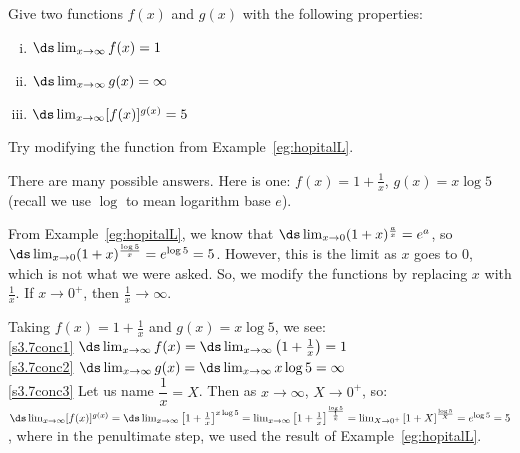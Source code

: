 \begin{Mquestion}\label{s3.7indet3}
Give two functions $f(x)$ and $g(x)$ with the following properties:
\begin{enumerate}[(i)]
\item\label{s3.7conc1} $\ds\lim_{x \to \infty} f(x)=1$
\item\label{s3.7conc2} $\ds\lim_{x \to \infty} g(x)=\infty$
\item\label{s3.7conc3} $\ds\lim_{x \to \infty} [f(x)]^{g(x)}=5$
\end{enumerate}
\end{Mquestion}
\begin{hint} Try modifying the function from Example~\ref*{eg:hopitalL}.%
\end{hint}
\begin{answer} There are many possible answers. Here is one: $f(x)=1+\frac{1}{x}$, $g(x)=x\log 5$ (recall we use $\log$ to mean logarithm base $e$).
\end{answer}
\begin{solution}
From Example~\ref*{eg:hopitalL}, we know that $\ds\lim_{x \to 0} (1+x)^{\frac{a}{x}}=e^a$, so $\ds\lim_{x \to 0} (1+x)^{\frac{\log 5}{x}}=e^{\log 5}=5$. However, this is the limit as $x$ goes to 0, which is not what we were asked. So, we modify the functions by replacing $x$ with $\frac{1}{x}$. If $x \to 0^+$, then $\frac{1}{x} \to \infty$.

Taking $f(x)=1+\frac{1}{x}$ and $g(x)=x\log 5$, we see:\\
\eqref{s3.7conc1} $\ds\lim_{x \to \infty} f(x)=\ds\lim_{x \to \infty } \left(1+\frac{1}{x}\right)=1$\\
\eqref{s3.7conc2} $\ds\lim_{x \to \infty} g(x)=\ds\lim_{x \to \infty} x\log 5=\infty$\\
\eqref{s3.7conc3} Let us name $\dfrac{1}{x}=X$. Then as $x \to \infty$, $X \to 0^+$, so:\\
 $\ds\lim_{x \to \infty} [f(x)]^{g(x)}=\ds\lim_{x \to \infty} \left[1+\frac{1}{x}\right]^{x\log 5}=\lim_{x \to \infty} \left[1+\frac{1}{x}\right]^{\frac{\log 5}{\frac{1}{x}}}=
\lim_{X \to 0^+} \left[1+X\right]^{\frac{\log 5}{X}}=e^{\log 5}=5
$,
where in the penultimate step, we used  the result of Example~\ref*{eg:hopitalL}.
\end{solution}
\subsection*{\Procedural}


